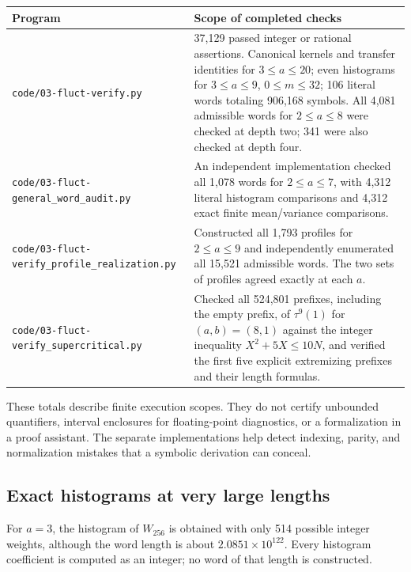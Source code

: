 \documentclass[11pt]{article}
\numberwithin{equation}{section}
\theoremstyle{definition}
\theoremstyle{remark}
\begin{document}
\begin{center}
\small
\begin{tabular}{p{}p{}}
\toprule
Program & Scope of completed checks\\
\midrule
\texttt{code/03-fluct-}\newline\texttt{verify.py}
& 37,129 passed integer or rational assertions.
Canonical kernels and transfer identities for $3\leq a\leq20$;
even histograms for $3\leq a\leq9$, $0\leq m\leq32$;
106 literal words totaling 906,168 symbols.
All 4,081 admissible words for $2\leq a\leq8$ were
checked at depth two; 341 were also checked at depth four.\\[3pt]
\texttt{code/03-fluct-}\newline\texttt{general\_word\_audit.py}
& An independent implementation checked all 1,078 words
for $2\leq a\leq7$, with 4,312 literal histogram comparisons
and 4,312 exact finite mean/variance comparisons.\\[3pt]
\texttt{code/03-fluct-}\newline\texttt{verify\_profile\_}\newline\texttt{realization.py}
& Constructed all 1,793 profiles for $2\leq a\leq9$ and
independently enumerated all 15,521 admissible words.
The two sets of profiles agreed exactly at each $a$.\\[3pt]
\texttt{code/03-fluct-}\newline\texttt{verify\_}\newline\texttt{supercritical.py}
& Checked all 524,801 prefixes, including the empty prefix,
of $\tau^9(1)$ for $(a,b)=(8,1)$ against the integer
inequality $X^2+5X\leq10N$, and verified the first five
explicit extremizing prefixes and their length formulas.\\
\bottomrule
\end{tabular}
\end{center}

These totals describe finite execution scopes. They do not certify
unbounded quantifiers, interval enclosures for floating-point
diagnostics, or a formalization in a proof assistant.
The separate implementations help detect indexing, parity, and
normalization mistakes that a symbolic derivation can conceal.

\subsection{Exact histograms at very large lengths}

For $a=3$, the histogram of $W_{256}$ is obtained with only
514 possible integer weights, although the word length is about
$2.0851\times10^{122}$. Every histogram coefficient is computed
as an integer; no word of that length is constructed.
\end{document}
